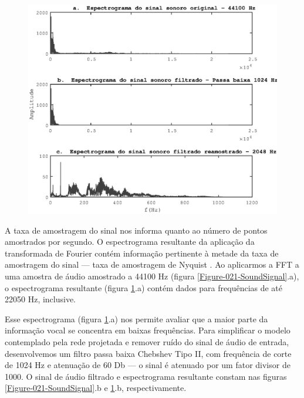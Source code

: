 \begin{figure}
  \centering
  \captionsetup{type=figure}
  \hspace*{-1.75cm}
  \includegraphics[scale=1]{./figures/Figure-022-Spectrograms.eps}
	\label{Figure-022-Spectrograms}
\end{figure}

A taxa de amostragem do sinal nos informa quanto ao número de pontos amostrados
por segundo. O espectrograma resultante da aplicação da transformada de Fourier
contém informação pertinente à metade da taxa de amostragem do sinal --- taxa de
amostragem de Nyquist \cite{Brigham:1988:FFT:83}. Ao aplicarmos a FFT a uma
amostra de áudio amostrado a 44100 Hz (figura \ref{Figure-021-SoundSignal}.a), o
espectrograma resultante (figura \ref{Figure-022-Spectrograms}.a) contém dados
para frequências de até 22050 Hz, inclusive.

Esse espectrograma (figura \ref{Figure-022-Spectrograms}.a) nos
permite avaliar que a maior parte da informação vocal se concentra em baixas
frequências. Para simplificar o modelo contemplado pela rede projetada e remover
ruído do sinal de áudio de entrada, desenvolvemos um filtro passa baixa Chebshev
Tipo II, com frequência de corte de 1024 Hz e atenuação de 60 Db --- o sinal é
atenuado por um fator divisor de 1000. O sinal de áudio filtrado e espectrograma
resultante constam nas figuras \ref{Figure-021-SoundSignal}.b e
\ref{Figure-022-Spectrograms}.b, respectivamente.

